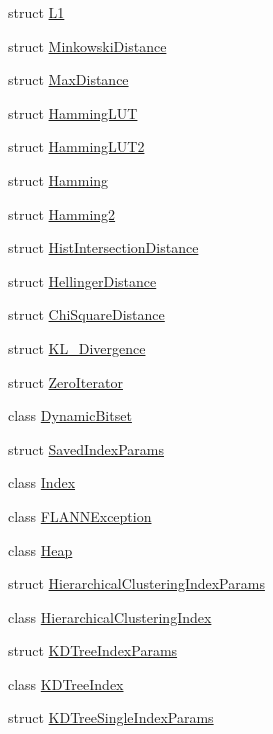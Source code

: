 \begin{DoxyCompactItemize}
\item 
struct \hyperlink{structcvflann_1_1L1}{L1}
\item 
struct \hyperlink{structcvflann_1_1MinkowskiDistance}{Minkowski\-Distance}
\item 
struct \hyperlink{structcvflann_1_1MaxDistance}{Max\-Distance}
\item 
struct \hyperlink{structcvflann_1_1HammingLUT}{Hamming\-L\-U\-T}
\item 
struct \hyperlink{structcvflann_1_1HammingLUT2}{Hamming\-L\-U\-T2}
\item 
struct \hyperlink{structcvflann_1_1Hamming}{Hamming}
\item 
struct \hyperlink{structcvflann_1_1Hamming2}{Hamming2}
\item 
struct \hyperlink{structcvflann_1_1HistIntersectionDistance}{Hist\-Intersection\-Distance}
\item 
struct \hyperlink{structcvflann_1_1HellingerDistance}{Hellinger\-Distance}
\item 
struct \hyperlink{structcvflann_1_1ChiSquareDistance}{Chi\-Square\-Distance}
\item 
struct \hyperlink{structcvflann_1_1KL__Divergence}{K\-L\-\_\-\-Divergence}
\item 
struct \hyperlink{structcvflann_1_1ZeroIterator}{Zero\-Iterator}
\item 
class \hyperlink{classcvflann_1_1DynamicBitset}{Dynamic\-Bitset}
\item 
struct \hyperlink{structcvflann_1_1SavedIndexParams}{Saved\-Index\-Params}
\item 
class \hyperlink{classcvflann_1_1Index}{Index}
\item 
class \hyperlink{classcvflann_1_1FLANNException}{F\-L\-A\-N\-N\-Exception}
\item 
class \hyperlink{classcvflann_1_1Heap}{Heap}
\item 
struct \hyperlink{structcvflann_1_1HierarchicalClusteringIndexParams}{Hierarchical\-Clustering\-Index\-Params}
\item 
class \hyperlink{classcvflann_1_1HierarchicalClusteringIndex}{Hierarchical\-Clustering\-Index}
\item 
struct \hyperlink{structcvflann_1_1KDTreeIndexParams}{K\-D\-Tree\-Index\-Params}
\item 
class \hyperlink{classcvflann_1_1KDTreeIndex}{K\-D\-Tree\-Index}
\item 
struct \hyperlink{structcvflann_1_1KDTreeSingleIndexParams}{K\-D\-Tree\-Single\-Index\-Params}
\item 

\end{DoxyCompactItemize}
